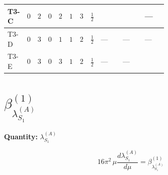 \documentclass[8pt]{article}
\begin{document}
\begin{landscape}
\begin{longtable}{@{}llcccccc >{\raggedright\arraybackslash}p{0.21\linewidth} >{\raggedright\arraybackslash}p{0.21\linewidth} >{\raggedright\arraybackslash}p{0.21\linewidth}@{}}
\midrule
T3-C & $0$ & $2$ & $0$ & $2$ & $1$ & $3$ & $\frac{1}{2}$ & \scriptsize\adjustbox{max width=\linewidth}{$\begin{gathered} +{\lambda_{12}^{(A)}} {\lambda_{HS_1}^{(A)}}\end{gathered}$} & \scriptsize\adjustbox{max width=\linewidth}{$\begin{gathered} {\lambda_{HS_2}^{(A)}} (3 T_{\nu}^{(2)}+6 \operatorname{Tr}\!\left({Y_d}\,\left({Y_d}\right)^{\dagger}\right)+2 \operatorname{Tr}\!\left({Y_e}\,\left({Y_e}\right)^{\dagger}\right)+6 \operatorname{Tr}\!\left({Y_u}\,\left({Y_u}\right)^{\dagger}\right))\end{gathered}$} & --- \\
\midrule
T3-D & $0$ & $3$ & $0$ & $1$ & $1$ & $2$ & $\frac{1}{2}$ & --- & --- & --- \\
\midrule
T3-E & $0$ & $3$ & $0$ & $3$ & $1$ & $2$ & $\frac{1}{2}$ & --- & --- & \scriptsize\adjustbox{max width=\linewidth}{$\begin{gathered} +12 {\lambda_{12}^{(A)}} {\lambda_{HS_1}^{(A)}}\end{gathered}$} \\
\midrule
\bottomrule
\end{longtable}
\clearpage
\section*{$\beta_{\lambda_{S_1}^{(A)}}^{(1)}$}
\noindent\textbf{Quantity: }$\lambda_{S_1}^{(A)}$\par\smallskip
\[16\pi^2\,\mu\frac{d \lambda_{S_1}^{(A)}}{d\mu}=\beta_{\lambda_{S_1}^{(A)}}^{(1)}\]

\end{landscape}
\end{document}
